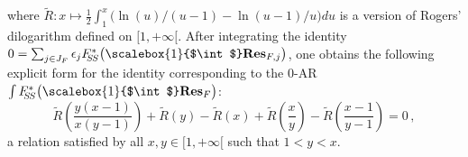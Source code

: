 \documentclass[11pt]{amsart}
\newcommand{\bk}{\bigskip}
\begin{document}
\begin{itemize}
where $\tilde R: x\mapsto \frac12 \int_1^x \big( {\ln  \left(u \right)}/{(u -1)}-{\ln  \left(u -1\right)}/{u}\big)du$ is a version of Rogers' dilogarithm defined on $[1,+\infty[$.  After integrating the identity $0=\sum_{j\in J_F} \epsilon_j F_{\hspace{-0.05cm} 
\hspace{-0.04cm}
S\hspace{-0.03cm}S}^*\big( 
\hspace{-0.0cm}
\scalebox{1}{$\int$}  \hspace{-0.0cm} {\bf Res}_{F,j}\big)$, one obtains the following explicit form for the identity corresponding to the 0-AR $\int F_{\hspace{-0.05cm} 
\hspace{-0.04cm}
S\hspace{-0.03cm}S}^*\big( 
\hspace{-0.0cm}
\scalebox{1}{$\int$}  \hspace{-0.0cm} {\bf Res}_{F}\big)$: 
\begin{equation}%
\label{Eq:Rtilde}
\tilde R \left( \frac{y(x-1)}{x(y-1)}\right)
+ \tilde R \left( y\right)
-\tilde R \left(x\right)
+\tilde R \left( \frac{x}{y}\right)
-\tilde R \left( \frac{x-1}{y-1}\right)=0\, ,
\end{equation}%
a relation  satisfied by all $x,y\in [1,+\infty[$ such that $1< y <x$. 
\end{itemize} %
\bk 
\end{document}
